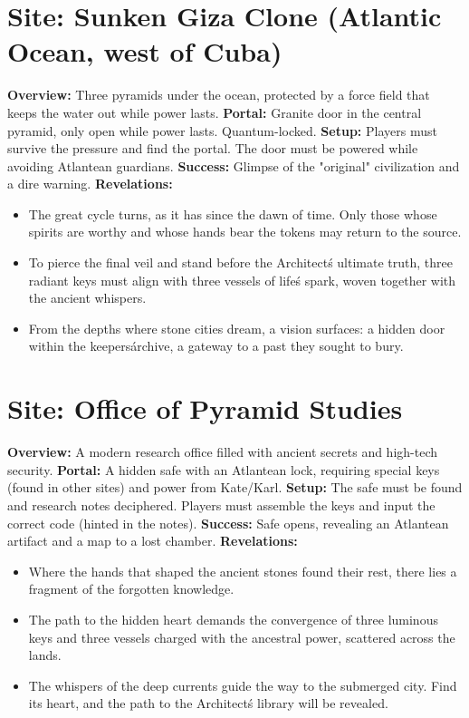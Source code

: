 \documentclass[12pt]{article}
\begin{document}
\hrulefill

\section*{Site: Sunken Giza Clone (Atlantic Ocean, west of Cuba)}
\textbf{Overview:}
Three pyramids under the ocean, protected by a force field that keeps the water out while power lasts.
\textbf{Portal:}
Granite door in the central pyramid, only open while power lasts. Quantum-locked.
\textbf{Setup:}
Players must survive the pressure and find the portal. The door must be powered while avoiding Atlantean guardians.
\textbf{Success:}
Glimpse of the "original" civilization and a dire warning.
\textbf{Revelations:}
\begin{itemize}
  \item The great cycle turns, as it has since the dawn of time. Only those whose spirits are worthy and whose hands bear the tokens may return to the source.
  \item To pierce the final veil and stand before the Architect\'s ultimate truth, three radiant keys must align with three vessels of life\'s spark, woven together with the ancient whispers.
  \item From the depths where stone cities dream, a vision surfaces: a hidden door within the keepers\' archive, a gateway to a past they sought to bury.
\end{itemize}

\hrulefill

\section*{Site: Office of Pyramid Studies}
\textbf{Overview:}
A modern research office filled with ancient secrets and high-tech security.
\textbf{Portal:}
A hidden safe with an Atlantean lock, requiring special keys (found in other sites) and power from Kate/Karl.
\textbf{Setup:}
The safe must be found and research notes deciphered. Players must assemble the keys and input the correct code (hinted in the notes).
\textbf{Success:}
Safe opens, revealing an Atlantean artifact and a map to a lost chamber.
\textbf{Revelations:}
\begin{itemize}
  \item Where the hands that shaped the ancient stones found their rest, there lies a fragment of the forgotten knowledge.
  \item The path to the hidden heart demands the convergence of three luminous keys and three vessels charged with the ancestral power, scattered across the lands.
  \item The whispers of the deep currents guide the way to the submerged city. Find its heart, and the path to the Architect\'s library will be revealed.
\end{itemize}
\end{document}
